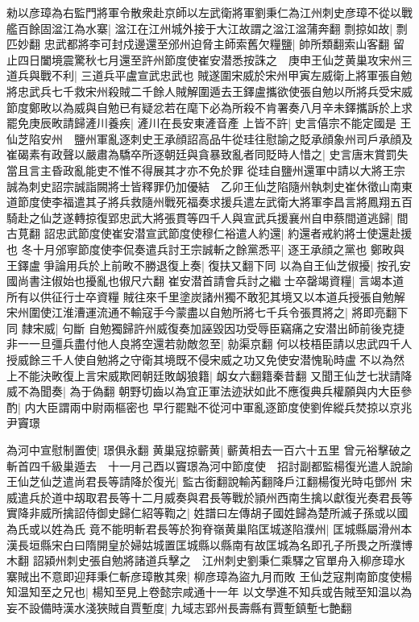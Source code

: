 勑以彦璋為右監門將軍令散衆赴京師以左武衛將軍劉秉仁為江州刺史彦璋不從以戰艦百餘固湓江為水寨|{
	湓江在江州城外接于大江故謂之湓江湓蒲奔翻}
剽掠如故|{
	剽匹妙翻}
忠武都將李可封戍邊還至邠州迫脅主師索舊欠糧鹽|{
	帥所類翻索山客翻}
留止四日闔境震驚秋七月還至許州節度使崔安潜悉按誅之　庚申王仙芝黄巢攻宋州三道兵與戰不利|{
	三道兵平盧宣武忠武也}
賊遂圍宋威於宋州甲寅左威衛上將軍張自勉將忠武兵七千救宋州殺賊二千餘人賊解圍遁去王鐸盧攜欲使張自勉以所將兵受宋威節度鄭畋以為威與自勉已有疑忿若在麾下必為所殺不肯署奏八月辛未鐸攜訴於上求罷免庚辰畋請歸滻川養疾|{
	滻川在長安東滻音產}
上皆不許|{
	史言僖宗不能定國是}
王仙芝陷安州　鹽州軍亂逐刺史王承顔詔高品牛從珪往慰諭之貶承顔象州司戶承顔及崔碣素有政聲以嚴肅為驕卒所逐朝廷與貪暴致亂者同貶時人惜之|{
	史言唐末賞罰失當且言主昏政亂能吏不惟不得展其才亦不免於罪}
從珪自鹽州還軍中請以大將王宗誠為刺史詔宗誠詣闕將士皆釋罪仍加優結　乙卯王仙芝陷隨州執刺史崔休徵山南東道節度使李福遣其子將兵救隨州戰死福奏求援兵遣左武衛大將軍李昌言將鳳翔五百騎赴之仙芝遂轉掠復郢忠武大將張貫等四千人與宣武兵援襄州自申蔡間道逃歸|{
	間古莧翻}
詔忠武節度使崔安潜宣武節度使穆仁裕遣人約還|{
	約還者戒約將士使還赴援也}
冬十月邠寧節度使李侃奏遣兵討王宗誠斬之餘黨悉平|{
	逐王承顔之黨也}
鄭畋與王鐸盧爭論用兵於上前畋不勝退復上奏|{
	復扶又翻下同}
以為自王仙芝俶擾|{
	按孔安國尚書注俶始也擾亂也俶尺六翻}
崔安潜首請會兵討之繼士卒罄竭資糧|{
	言竭本道所有以供征行士卒資糧}
賊往來千里塗炭諸州獨不敢犯其境又以本道兵授張自勉解宋州圍使江淮漕運流通不輸寇手今蒙盡以自勉所將七千兵令張貫將之|{
	將即亮翻下同}
隸宋威|{
	句斷}
自勉獨歸許州威復奏加誣毀因功受辱臣竊痛之安潜出師前後克捷非一一旦彊兵盡付他人良將空還若勍敵忽至|{
	勍渠京翻}
何以枝梧臣請以忠武四千人授威餘三千人使自勉將之守衛其境既不侵宋威之功又免使安潜愧恥時盧不以為然上不能決畋復上言宋威欺罔朝廷敗衂狼籍|{
	衂女六翻籍秦昔翻}
又聞王仙芝七狀請降威不為聞奏|{
	為于偽翻}
朝野切齒以為宜正軍法迹狀如此不應復典兵權願與内大臣參酌|{
	内大臣謂兩中尉兩樞密也}
早行罷黜不從河中軍亂逐節度使劉侔縱兵焚掠以京兆尹竇璟

為河中宣慰制置使|{
	璟俱永翻}
黄巢寇掠蘄黄|{
	蘄黄相去一百六十五里}
曾元裕擊破之斬首四千級巢遁去　十一月己酉以竇璟為河中節度使　招討副都監楊復光遣人說諭王仙芝仙芝遣尚君長等請降於復光|{
	監古銜翻說輸芮翻降戶江翻楊復光時屯鄧州}
宋威遣兵於道中刼取君長等十二月威奏與君長等戰於頴州西南生擒以獻復光奏君長等實降非威所擒詔侍御史歸仁紹等鞫之|{
	姓譜曰左傳胡子國姓歸為楚所滅子孫或以國為氏或以姓為氏}
竟不能明斬君長等於狗脊嶺黄巢陷匡城遂陷濮州|{
	匡城縣屬滑州本漢長垣縣宋白曰隋開皇於婦姑城置匡城縣以縣南有故匡城為名即孔子所畏之所濮博木翻}
詔潁州刺史張自勉將諸道兵擊之　江州刺史劉秉仁乘驛之官單舟入柳彦璋水寨賊出不意即迎拜秉仁斬彦璋散其衆|{
	柳彦璋為盜九月而敗}
王仙芝寇荆南節度使楊知温知至之兄也|{
	楊知至見上卷懿宗咸通十一年}
以文學進不知兵或告賊至知温以為妄不設備時漢水淺狹賊自賈塹度|{
	九域志郢州長壽縣有賈塹鎮塹七艶翻}


